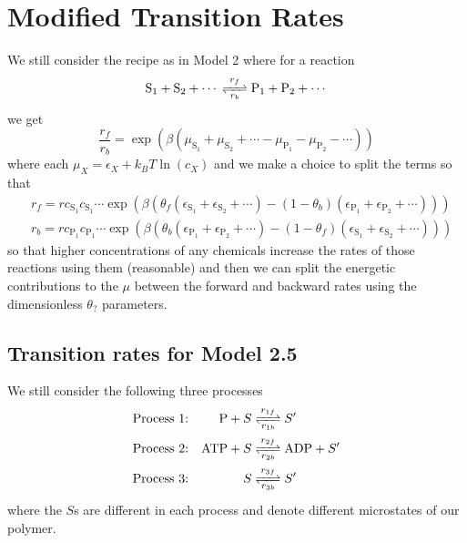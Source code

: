 \documentclass[11pt]{article}
\begin{document}
\section{Modified Transition Rates}
We still consider the recipe as in Model 2 where for a reaction
\begin{equation}
    \ce{S_1 + S_2 + $\cdots$ <=>[$r_f$][$r_b$] P_1 + P_2 + $\cdots$}
\end{equation}
we get
\begin{equation}
    \frac{r_f}{r_b} = \exp(\beta(\mu_{\text{S}_1} + \mu_{\text{S}_2} + \cdots - \mu_{\text{P}_1} - \mu_{\text{P}_2} - \cdots))
\end{equation}
where each $\mu_X = \epsilon_X + \si{k_B}T\ln(c_X)$ and we make a choice to split the terms so that
\begin{align}
    &r_f = r c_{\text{S}_1}c_{\text{S}_1}\cdots \exp(\beta(\theta_f(\epsilon_{\text{S}_1} + \epsilon_{\text{S}_2} + \cdots) - (1-\theta_b)(\epsilon_{\text{P}_1} + \epsilon_{\text{P}_2} + \cdots))) \\
    &r_b = r c_{\text{P}_1}c_{\text{P}_1}\cdots \exp(\beta(\theta_b(\epsilon_{\text{P}_1} + \epsilon_{\text{P}_2} + \cdots) - (1-\theta_f)(\epsilon_{\text{S}_1} + \epsilon_{\text{S}_2} + \cdots)))
\end{align}
so that higher concentrations of any chemicals increase the rates of those reactions using them (reasonable) and then we can split the energetic contributions to the $\mu$ between the forward and backward rates using the dimensionless $\theta_?$ parameters.

\subsection{Transition rates for Model 2.5}
We still consider the following three processes
\begin{align}
    \text{Process 1:} && \ce{P + $S$ &<=>[$r_{1f}$][$r_{1b}$] $S'$} \\
    \text{Process 2:} && \ce{ATP + $S$ &<=>[$r_{2f}$][$r_{2b}$] ADP + $S'$} \\
    \text{Process 3:} && \ce{$S$ &<=>[$r_{3f}$][$r_{3b}$] $S'$}
\end{align}
where the $S$s are different in each process and denote different microstates of our polymer.
\end{document}

